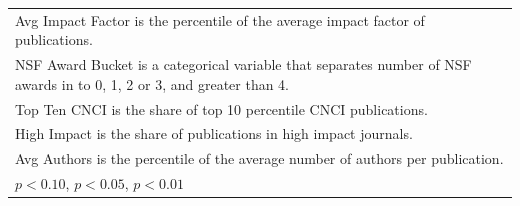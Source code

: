 \begin{table}[htbp]
\begin{tabular}{l*{9}{c}}
\multicolumn{10}{l}{\footnotesize Avg Impact Factor is the percentile of the average impact factor of publications.}\\
\multicolumn{10}{l}{\footnotesize NSF Award Bucket is a categorical variable that separates number of NSF awards in to 0, 1, 2 or 3, and greater than 4.}\\
\multicolumn{10}{l}{\footnotesize Top Ten CNCI is the share of top 10 percentile CNCI publications.}\\
\multicolumn{10}{l}{\footnotesize High Impact is the share of publications in high impact journals.}\\
\multicolumn{10}{l}{\footnotesize Avg Authors is the percentile of the average number of authors per publication.}\\
\multicolumn{10}{l}{\footnotesize \sym{*} \(p<0.10\), \sym{**} \(p<0.05\), \sym{***} \(p<0.01\)}\\
\end{tabular}
\end{table}
